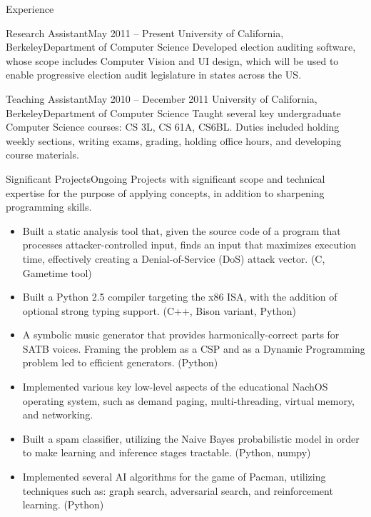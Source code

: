 \documentclass{resume}
\begin{document}
\begin{component}{Experience}
	\begin{position}{Research Assistant}{May 2011 -- Present}
	 	{University of California, Berkeley}{Department of Computer Science}
	{Developed election auditing software, whose scope includes Computer Vision and UI design, which 
	will be used to enable progressive election audit legislature in states across the US.}
	\end{position}

	\begin{position}{Teaching Assistant}{May 2010 -- December 2011}
		{University of California, Berkeley}{Department of Computer Science}
	{Taught several key undergraduate Computer Science courses: CS 3L, CS 61A, CS6BL. 
	 Duties included holding weekly sections, writing exams, grading, 
	holding office hours, and developing course materials.}
	\end{position}

	\begin{position}{Significant Projects}{Ongoing}
		{}{\vspace{-1.0em}}
	{Projects with significant scope and technical expertise for the purpose of applying concepts, in addition to
	sharpening programming skills.}

	\begin{itemize}
		\vspace{-0.5em}\item Built a static analysis tool that, given the source code of a program that
		processes attacker-controlled input, finds an input that maximizes execution time, effectively
		creating a Denial-of-Service (DoS) attack vector. (C, Gametime tool)
		\vspace{-0.5em}\item Built a Python 2.5 compiler targeting the x86 ISA, with the addition of
		optional strong typing support. (C++, Bison variant, Python)
		\vspace{-0.5em}\item A symbolic music generator that provides harmonically-correct
		parts for SATB voices. Framing the problem as a CSP and as a Dynamic Programming problem led to efficient generators.
		(Python)
		\vspace{-0.5em}\item Implemented various key low-level aspects of the 
		educational NachOS operating system, such as demand paging, multi-threading, virtual memory, and 
		networking.
		\vspace{-0.5em}\item Built a spam classifier, utilizing the Naive Bayes probabilistic model in order to make
		learning and inference stages tractable. (Python, numpy)
		\vspace{-0.5em}\item Implemented several AI algorithms for the game of Pacman, utilizing
		techniques such as: graph search, adversarial search, and reinforcement learning. (Python)
	\end{itemize}
	\end{position}
\end{component}
\end{document}
